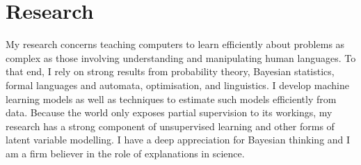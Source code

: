 \section*{Research}

My research concerns teaching computers to learn efficiently about problems as complex as those involving understanding and manipulating human languages. To that end, I rely on strong results from probability theory, Bayesian statistics, formal languages and automata, optimisation, and linguistics. I develop machine learning models as well as techniques to estimate such models efficiently from data. Because the world only exposes partial supervision to its workings, my research has a strong component of unsupervised learning and other forms of latent variable modelling. 
I have a deep appreciation for Bayesian thinking and I am a firm believer in the role of explanations in science. 
